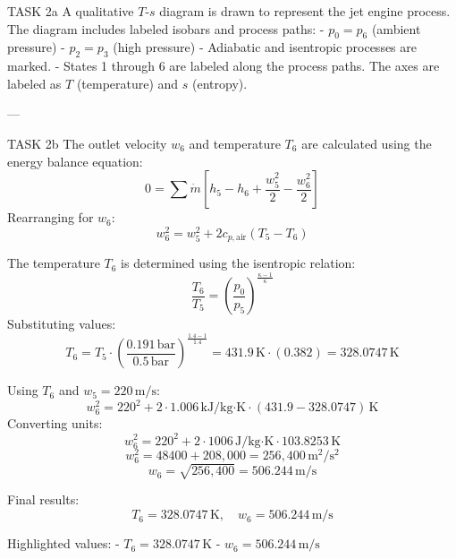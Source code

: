 TASK 2a  
A qualitative \( T \)-\( s \) diagram is drawn to represent the jet engine process. The diagram includes labeled isobars and process paths:  
- \( p_0 = p_6 \) (ambient pressure)  
- \( p_2 = p_3 \) (high pressure)  
- Adiabatic and isentropic processes are marked.  
- States 1 through 6 are labeled along the process paths.  
The axes are labeled as \( T \) (temperature) and \( s \) (entropy).  

---

TASK 2b  
The outlet velocity \( w_6 \) and temperature \( T_6 \) are calculated using the energy balance equation:  
\[
0 = \sum \dot{m} \left[ h_5 - h_6 + \frac{w_5^2}{2} - \frac{w_6^2}{2} \right]
\]  
Rearranging for \( w_6 \):  
\[
w_6^2 = w_5^2 + 2 c_{p,\text{air}} (T_5 - T_6)
\]  

The temperature \( T_6 \) is determined using the isentropic relation:  
\[
\frac{T_6}{T_5} = \left( \frac{p_0}{p_5} \right)^{\frac{\kappa - 1}{\kappa}}
\]  
Substituting values:  
\[
T_6 = T_5 \cdot \left( \frac{0.191 \, \text{bar}}{0.5 \, \text{bar}} \right)^{\frac{1.4 - 1}{1.4}} = 431.9 \, \text{K} \cdot (0.382) = 328.0747 \, \text{K}
\]  

Using \( T_6 \) and \( w_5 = 220 \, \text{m/s} \):  
\[
w_6^2 = 220^2 + 2 \cdot 1.006 \, \text{kJ/kg·K} \cdot (431.9 - 328.0747) \, \text{K}
\]  
Converting units:  
\[
w_6^2 = 220^2 + 2 \cdot 1006 \, \text{J/kg·K} \cdot 103.8253 \, \text{K}
\]  
\[
w_6^2 = 48400 + 208,000 = 256,400 \, \text{m}^2/\text{s}^2
\]  
\[
w_6 = \sqrt{256,400} = 506.244 \, \text{m/s}
\]  

Final results:  
\[
T_6 = 328.0747 \, \text{K}, \quad w_6 = 506.244 \, \text{m/s}
\]  

Highlighted values:  
- \( T_6 = 328.0747 \, \text{K} \)  
- \( w_6 = 506.244 \, \text{m/s} \)  

